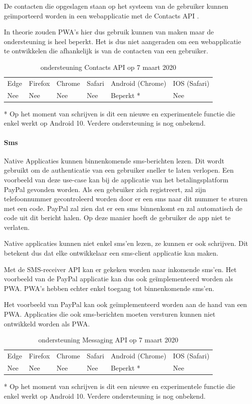 De contacten die opgeslagen staan op het systeem van de gebruiker kunnen geïmporteerd worden in een webapplicatie met de Contacts API \autocite{Tibbett2014}.

In theorie zouden PWA's hier dus gebruik kunnen van maken maar de ondersteuning is heel beperkt. Het is dus niet aangeraden om een webapplicatie te ontwikkelen die afhankelijk is van de contacten van een gebruiker.

\begin{table}[H]
	\centering
	\begin{tabular}{llllll}
		Edge & Firefox & Chrome & Safari & Android (Chrome) & IOS (Safari) \\
		Nee   & Nee      &  Nee     & Nee     & Beperkt *               & Nee          
	\end{tabular}	
	\caption{ondersteuning Contacts API op 7 maart 2020}{ * Op het moment van schrijven is dit een nieuwe en experimentele functie die enkel werkt op 
	Android 10. Verdere ondersteuning is nog onbekend.}
\end{table}	


\paragraph{Sms}
Native Applicaties kunnen binnenkomende sms-berichten lezen. Dit wordt gebruikt om de authenticatie van een gebruiker sneller te laten verlopen. Een voorbeeld van deze use-case kan bij de applicatie van het betalingsplatform PayPal gevonden worden. Als een gebruiker zich registreert, zal zijn telefoonnummer gecontroleerd worden door er een sms naar dit nummer te sturen met een code. PayPal zal zien dat er een sms binnenkomt en zal automatisch de code uit dit bericht halen. Op deze manier hoeft de gebruiker de app niet te verlaten.

Native applicaties kunnen niet enkel sms’en lezen, ze kunnen er ook schrijven. Dit betekent dus dat elke ontwikkelaar een sms-client applicatie kan maken.

Met de SMS-receiver API \autocite{Fullea2015} kan er gekeken worden naar inkomende sms’en. Het voorbeeld van de PayPal applicatie kan dus ook geïmplementeerd worden als PWA. PWA's hebben echter enkel toegang tot binnenkomende sms’en. 

Het voorbeeld van PayPal kan ook geïmplementeerd worden aan de hand van een PWA. Applicaties die ook sms-berichten moeten versturen kunnen niet ontwikkeld worden als PWA.

\begin{table}[H]
	\centering
	\begin{tabular}{llllll}
		Edge & Firefox & Chrome & Safari & Android (Chrome) & IOS (Safari) \\
		Nee   & Nee      &  Nee     & Nee     & Beperkt *             & Nee          
	\end{tabular}	
	\caption{ondersteuning Messaging API op 7 maart 2020}{* Op het moment van schrijven is dit een nieuwe en experimentele functie die enkel werkt op 
		Android 10. Verdere ondersteuning is nog onbekend.}
\end{table}	



